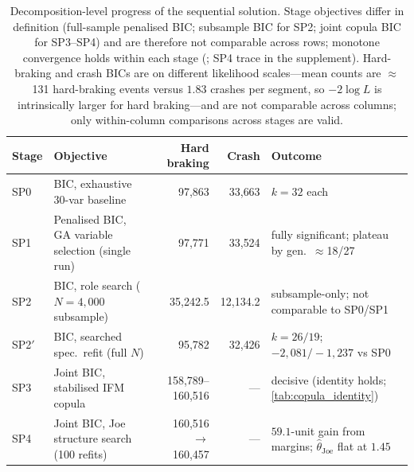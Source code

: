 \documentclass[letterpaper,8pt]{extarticle}  %
\begin{document}
\begin{doublespacing}
\begin{linenumbers}
\begin{table}[!ht]
  \footnotesize
  \caption{Decomposition-level progress of the sequential solution. Stage objectives differ in definition (full-sample penalised BIC; subsample BIC for SP2; joint copula BIC for SP3--SP4) and are therefore not comparable across rows; monotone convergence holds within each stage (; SP4 trace in the supplement). Hard-braking and crash BICs are on different likelihood scales---mean counts are $\approx$131 hard-braking events versus $1.83$ crashes per segment, so $-2\log L$ is intrinsically larger for hard braking---and are not comparable across columns; only within-column comparisons across stages are valid.}\label{tab:decomp_conv}
  \begin{center}
    \begin{tabular}{llrrl}
      \toprule
      Stage & Objective & Hard braking & Crash & Outcome \\
      \midrule
      SP0 & BIC, exhaustive 30-var baseline & 97{,}863 & 33{,}663 & $k=32$ each \\
      SP1 & Penalised BIC, GA variable selection (single run) & 97{,}771 & 33{,}524 & fully significant; plateau by gen.\ $\approx$18/27 \\
      SP2 & BIC, role search ($N=4{,}000$ subsample) & 35{,}242.5 & 12{,}134.2 & subsample-only; not comparable to SP0/SP1 \\
      SP2$'$ & BIC, searched spec.\ refit (full $N$) & 95{,}782 & 32{,}426 & $k=26/19$; $-2{,}081/-1{,}237$ vs SP0 \\
      SP3 & Joint BIC, stabilised IFM copula & 158{,}789--160{,}516 & --- & decisive (identity holds; \cref{tab:copula_identity}) \\
      SP4 & Joint BIC, Joe structure search (100 refits) & 160{,}516$\to$160{,}457 & --- & $59.1$-unit gain from margins; $\hat\theta_{\text{Joe}}$ flat at $1.45$ \\
      \bottomrule
    \end{tabular}
  \end{center}
\end{table}



\FloatBarrier


\end{linenumbers}
\end{doublespacing}
\end{document}
